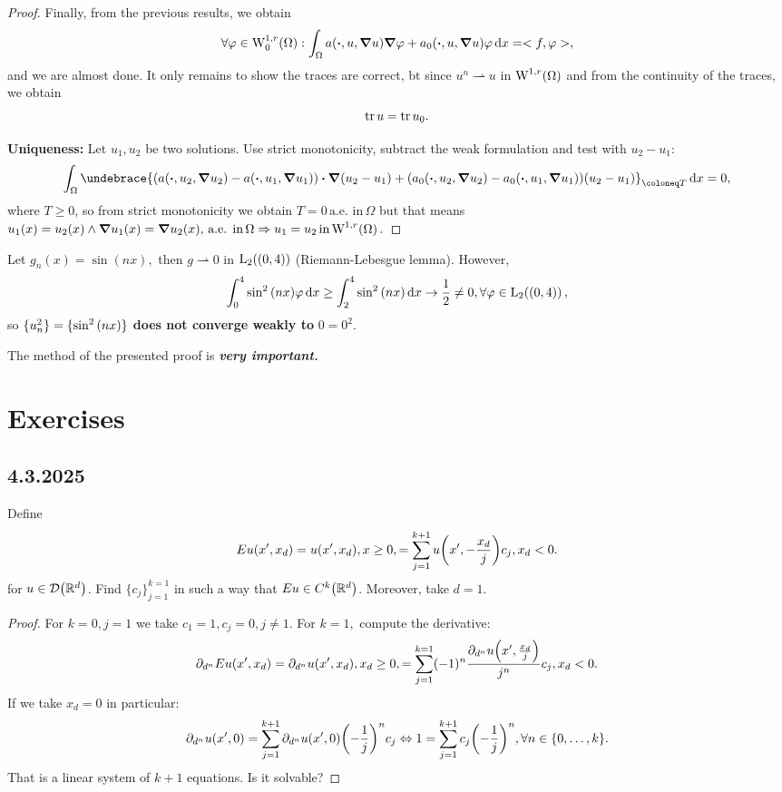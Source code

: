 \documentclass{article}
\begin{document}
\begin{proof}
Finally, from the previous results, we obtain
\[
	\forall \varphi \in \WkpzeroSet[1][r]{\Omega}: \int_{\Omega}a\qty(\vdot, u, \grad u)\grad \varphi+a_0\qty(\vdot, u, \grad u)\varphi\dd{x} = <f,\varphi>,
\]
and we are almost done. It only remains to show the traces are correct, bt since $u^n \rightharpoonup u$ in $\WkpSet[1][r]{\Omega}$ and from the continuity of the traces, we obtain
\[
	\tr u = \tr u_0.
\]

\textbf{Uniqueness:} Let $u_1, u_2$ be two solutions. Use strict monotonicity, subtract the weak formulation and test with $u_2-u_1$:
\[
	\int_{\Omega}\undebrace{\qty(a\qty(\vdot, u_2, \grad u_2)-a\qty(\vdot, u_1, \grad u_1))\vdot \grad\qty(u_2 - u_1)+\qty(a_0\qty(\vdot, u_2, \grad u_2)-a_0\qty(\vdot, u_1, \grad u_1))\qty(u_2-u_1)}_{\coloneq T}\dd{x} =0,
\]
where $T \geq 0$, so from strict monotonicity we obtain $T =0 \, \text{a.e. in} \, \Omega$ but that means $u_1(x) = u_2(x) \wedge \grad u_1(x) = \grad u_2 (x), \, \text{a.e. in} \, \Omega \Rightarrow u_1 = u_2 \, \text{in} \, \WkpSet[1][r]{\Omega}.$
\end{proof}

\begin{example}
	Let $g_n(x) = \sin(nx), $ then $g \rightharpoonup 0$ in $\LpSet[2]{(0,4)}$ (Riemann-Lebesgue lemma). However,
	\[
		\int_0^4 \sin^{2}\qty(nx)\varphi \dd{x} \geq \int_2^4 \sin^{2}\qty(nx)\dd{x} \to \frac{1}{2} \neq 0, \forall \varphi \in \LpSet[2]{(0,4)},
	\]
	so $\{u_n^{2}\} = \{\sin^{2}\qty(nx)\}$ \textbf{does not converge weakly to } $0 = 0^{2}$.
\end{example}
\begin{remark}
    The method of the presented proof is \textbf{\textit{very important.}}
\end{remark}
\section{Exercises}
\label{sec:exercises}

\subsection{4.3.2025}
\label{sec:43}

\begin{example}
Define
\[
	Eu(x',x_d) = u(x',x_d), x \geq 0, = \sum_{j=1}^{k+1}u\qty(x',-\frac{x_d}{j})c_j, x_d<0.
\]
for $u \in \mathcal{D}\qty({\mathbb R}^d)$. Find $\{c_j\}_{j=1}^{k=1}$ in such a way that $Eu \in C^k\qty({\mathbb R}^d)$. Moreover, take $d=1$.
\end{example}
\begin{proof}
 For $k=0, j=1$ we take $c_1=1, c_j=0, j \neq 1$. For $k=1,$ compute the derivative:
\[
	\partial_{d^n}E u(x',x_d) = \partial_{d^n}u(x',x_d), x_d \geq 0, =\sum_{j=1}^{k=1}(-1)^n\frac{\partial_{d^n}u\qty(x',\frac{x_d}{j})}{j^n}c_j, x_d <0.
\]
If we take $x_d=0$ in particular:
\[
	\partial_{d^n}u\qty(x',0)= \sum_{j=1}^{k+1}\partial_{d^n}u\qty(x',0)\qty(-\frac{1}{j})^n c_j \Leftrightarrow 1 = \sum_{j=1}^{k+1}c_j \qty(-\frac{1}{j})^n, \forall n \in \{0,\dots,k\}.
\]
  That is a linear system of $k+1$ equations. Is it solvable?
\end{proof}
\end{document}
